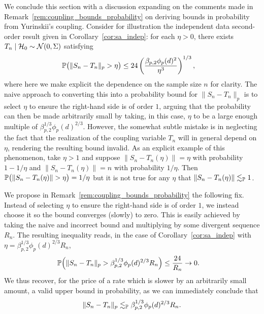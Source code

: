 We conclude this section with a discussion expanding on the comments made
in Remark~\ref{rem:coupling_bounds_probability} on deriving bounds in
probability from Yurinskii's coupling. Consider for illustration the
independent data second-order result given in
Corollary~\ref{cor:sa_indep}: for each $\eta > 0$,
there exists $T_n \mid \cH_0 \sim \cN(0, \Sigma)$ satisfying
%
\begin{align*}
  \P\big(\|S_n-T_n\|_p > \eta\big)
  &\leq
  24 \left(
    \frac{\beta_{p,2} \phi_p(d)^2}{\eta^3}
  \right)^{1/3},
\end{align*}
%
where here we make explicit the dependence on the sample size $n$ for clarity.
The naive approach to converting this into a probability bound for
$\|S_n-T_n\|_p$ is to select $\eta$ to ensure the right-hand side is
of order $1$, arguing that the probability can then be made arbitrarily
small by taking, in this case, $\eta$ to be a large enough multiple of
$\beta_{p,2}^{1/3} \phi_p(d)^{2/3}$. However, the somewhat subtle mistake is
in neglecting the fact that the realization of the coupling variable $T_n$
will in general depend on $\eta$, rendering the resulting
bound invalid.
As an explicit example of this phenomenon, take $\eta > 1$ and suppose
$\|S_n - T_n(\eta)\| = \eta$ with probability $1 - 1/\eta$ and
$\|S_n - T_n(\eta)\| = n$ with probability $1/\eta$.
Then $\P\big(\|S_n - T_n(\eta)\| > \eta\big) = 1/\eta$
but it is not true for any $\eta$ that $\|S_n - T_n(\eta)\| \lesssim_\P 1$.

We propose in Remark~\ref{rem:coupling_bounds_probability} the following fix.
Instead of selecting $\eta$ to ensure the right-hand side is of order $1$,
we instead choose it so the bound converges (slowly) to zero. This is
easily achieved by taking the naive and incorrect bound and multiplying
by some divergent sequence $R_n$. The resulting inequality reads,
in the case of Corollary~\ref{cor:sa_indep} with
$\eta = \beta_{p,2}^{1/3} \phi_p(d)^{2/3} R_n$,
%
\begin{align*}
  \P\Big(\|S_n-T_n\|_p >
    \beta_{p,2}^{1/3} \phi_p(d)^{2/3} R_n
  \Big)
  &\leq
  \frac{24}{R_n}
  \to 0.
\end{align*}
%
We thus recover, for the price of a rate which is slower by an arbitrarily
small amount, a valid upper bound in probability, as we can immediately
conclude that
%
\begin{align*}
  \|S_n-T_n\|_p
  \lesssim_\P
  \beta_{p,2}^{1/3} \phi_p(d)^{2/3} R_n.
\end{align*}

